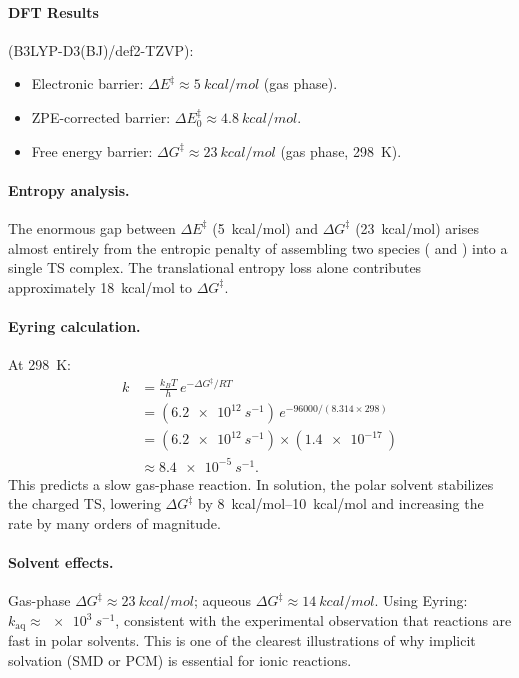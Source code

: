 \documentclass[11pt]{article}
\numberwithin{equation}{section}
\begin{document}
\paragraph{DFT Results} (B3LYP-D3(BJ)/def2-TZVP):
\begin{itemize}
\item Electronic barrier: $\Delta E^\ddagger \approx \SI{5}{kcal/mol}$ (gas phase).
\item ZPE-corrected barrier: $\Delta E_0^\ddagger \approx \SI{4.8}{kcal/mol}$.
\item Free energy barrier: $\Delta G^\ddagger \approx \SI{23}{kcal/mol}$ (gas phase, \SI{298}{K}).
\end{itemize}

\paragraph{Entropy analysis.} The enormous gap between $\Delta E^\ddagger$ (\SI{5}{kcal/mol}) and $\Delta G^\ddagger$ (\SI{23}{kcal/mol}) arises almost entirely from the entropic penalty of assembling two species ( and ) into a single TS complex. The translational entropy loss alone contributes approximately \SI{18}{kcal/mol} to $\Delta G^\ddagger$.

\paragraph{Eyring calculation.} At \SI{298}{K}:
\begin{align}
k &= \frac{k_BT}{h}\,e^{-\Delta G^\ddagger/RT} \nonumber\\
&= (\SI{6.2e12}{s^{-1}})\,e^{-96000/(8.314 \times 298)} \nonumber\\
&= (\SI{6.2e12}{s^{-1}})\times(\SI{1.4e-17}{}) \nonumber\\
&\approx \SI{8.4e-5}{s^{-1}}.
\end{align}
This predicts a slow gas-phase reaction. In solution, the polar solvent stabilizes the charged TS, lowering $\Delta G^\ddagger$ by \SIrange{8}{10}{kcal/mol} and increasing the rate by many orders of magnitude.

\paragraph{Solvent effects.} Gas-phase $\Delta G^\ddagger \approx \SI{23}{kcal/mol}$; aqueous $\Delta G^\ddagger \approx \SI{14}{kcal/mol}$. Using Eyring: $k_\text{aq} \approx \SI{e3}{s^{-1}}$, consistent with the experimental observation that  reactions are fast in polar solvents. This is one of the clearest illustrations of why implicit solvation (SMD or PCM) is essential for ionic reactions.
\end{document}
